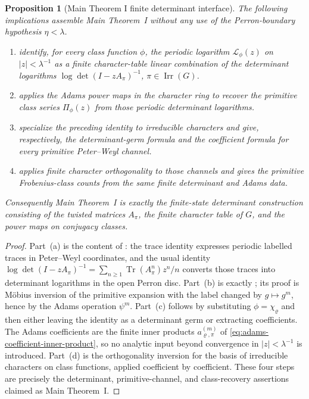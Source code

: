 \documentclass[11pt,a4paper]{amsart}
\theoremstyle{plain}
\newtheorem{proposition}[theorem]{Proposition}
\theoremstyle{definition}
\theoremstyle{remark}
\DeclareMathOperator{\Tr}{Tr}
\DeclareMathOperator{\Irr}{Irr}
\begin{document}
\begin{proposition}[Main Theorem I finite determinant interface]
  \label{prop:main-theorem-i-assembly-map}
  The following implications assemble Main Theorem~I without any use of
  the Perron-boundary hypothesis \(\eta<\lambda\).
  \begin{enumerate}[label=\textup{(\alph*)},leftmargin=*]
    \item {}
    identify, for every class function \(\phi\), the periodic logarithm
    \(\mathcal L_\phi(z)\) on \(|z|<\lambda^{-1}\) as a finite
    character-table linear combination of the determinant logarithms
    \(\log\det(I-zA_\pi)^{-1}\), \(\pi\in\Irr(G)\).
    \item {} applies the Adams power
    maps in the character ring to recover the primitive class series
    \(\Pi_\phi(z)\) from those periodic determinant logarithms.
    \item {} specialize the preceding identity to
    irreducible characters and give, respectively, the determinant-germ
    formula and the coefficient formula for every primitive Peter--Weyl
    channel.
    \item {} applies finite character
    orthogonality to those channels and gives the primitive Frobenius-class
    counts from the same finite determinant and Adams data.
  \end{enumerate}
  Consequently Main Theorem~I is exactly the finite-state determinant
  construction consisting of the twisted matrices \(A_\pi\), the finite
  character table of \(G\), and the power maps on conjugacy classes.
\end{proposition}

\begin{proof}
  Part~(a) is the content of
  : the
  trace identity expresses periodic labelled traces in Peter--Weyl
  coordinates, and the usual identity
  \(\log\det(I-zA_\pi)^{-1}=\sum_{n\ge1}\Tr(A_\pi^n)z^n/n\) converts those
  traces into determinant logarithms in the open Perron disc. Part~(b) is
  exactly ; its proof is M\"obius
  inversion of the primitive expansion with the label changed by
  \(g\mapsto g^m\), hence by the Adams operation \(\psi^m\). Part~(c)
  follows by substituting \(\phi=\chi_\varrho\) and then either leaving the
  identity as a determinant germ or extracting coefficients. The Adams
  coefficients are the finite inner products
  \(a_{\varrho,\pi}^{(m)}\) of
  \eqref{eq:adams-coefficient-inner-product}, so no analytic input beyond
  convergence in \(|z|<\lambda^{-1}\) is introduced. Part~(d) is the
  orthogonality inversion for the basis of irreducible characters on class
  functions, applied coefficient by coefficient. These four steps are
  precisely the determinant, primitive-channel, and class-recovery assertions
  claimed as Main Theorem~I.
\end{proof}
\end{document}
